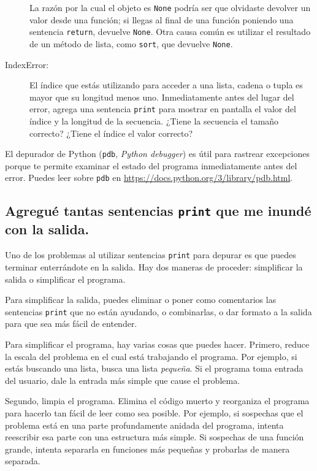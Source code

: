 \documentclass[10pt]{book}
\begin{document}
\begin{description}
La razón por la cual el objeto es {\tt None} podría ser que olvidaste
devolver un valor desde una función; si llegas al final de
una función poniendo una sentencia {\tt return}, devuelve
{\tt None}.  Otra causa común es utilizar el resultado de
un método de lista, como {\tt sort}, que devuelve {\tt None}.

\item[IndexError:] El índice que estás utilizando
para acceder a una lista, cadena o tupla es mayor que
su longitud menos uno.  Inmediatamente antes del lugar del error,
agrega una sentencia {\tt print} para mostrar en pantalla
el valor del índice y la longitud de la secuencia.
¿Tiene la secuencia el tamaño correcto?  ¿Tiene el índice el valor correcto?

\end{description}

El depurador de Python ({\tt pdb}, {\em Python debugger}) es útil para rastrear
excepciones porque te permite examinar el estado del
programa inmediatamente antes del error.  Puedes leer
sobre {\tt pdb} en \url{https://docs.python.org/3/library/pdb.html}.


\subsection{Agregué tantas sentencias {\tt print} que me inundé con
la salida.}

Uno de los problemas al utilizar sentencias {\tt print} para depurar
es que puedes terminar enterrándote en la salida.  Hay dos maneras
de proceder: simplificar la salida o simplificar el programa.

Para simplificar la salida, puedes eliminar o poner como comentarios
las sentencias {\tt print} que no están ayudando, o combinarlas, o dar formato
a la salida para que sea más fácil de entender.

Para simplificar el programa, hay varias cosas que puedes hacer.  Primero,
reduce la escala del problema en el cual está trabajando el programa.  Por
ejemplo, si estás buscando una lista, busca una lista {\em pequeña}.  Si el
programa toma entrada del usuario, dale la entrada más simple que cause el
problema.

Segundo, limpia el programa.  Elimina el código muerto y reorganiza el
programa para hacerlo tan fácil de leer como sea posible.  Por ejemplo, si
sospechas que el problema está en una parte profundamente anidada del programa,
intenta reescribir esa parte con una estructura más simple.  Si sospechas de
una función grande, intenta separarla en funciones más pequeñas y probarlas
de manera separada.
\end{document}
